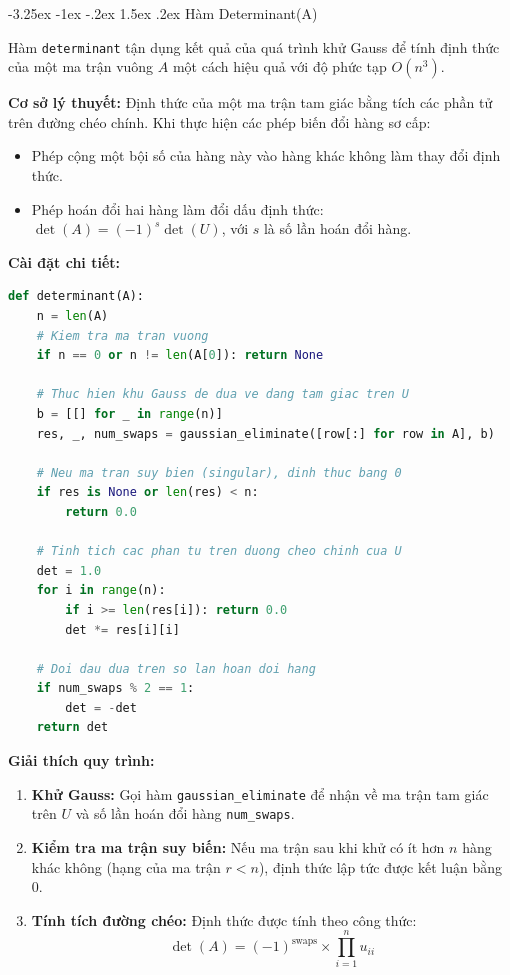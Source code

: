 \documentclass[12pt]{article}
\makeatletter
\newcommand\subsubsubsection{\@startsection{paragraph}{4}{\z@}%
    {-3.25ex \@plus -1ex \@minus -.2ex}%
    {1.5ex \@plus .2ex}%
    {\normalfont\normalsize\bfseries}}
\makeatother
\begin{document}
\subsubsubsection{Hàm Determinant(A)}

Hàm \texttt{determinant} tận dụng kết quả của quá trình khử Gauss để tính định thức của một ma trận vuông $A$ một cách hiệu quả với độ phức tạp $O(n^3)$.

\textbf{Cơ sở lý thuyết:}
Định thức của một ma trận tam giác bằng tích các phần tử trên đường chéo chính. Khi thực hiện các phép biến đổi hàng sơ cấp:
\begin{itemize}
    \item Phép cộng một bội số của hàng này vào hàng khác không làm thay đổi định thức.
    \item Phép hoán đổi hai hàng làm đổi dấu định thức: $\det(A) = (-1)^s \det(U)$, với $s$ là số lần hoán đổi hàng.
\end{itemize}

\textbf{Cài đặt chi tiết:}

\begin{lstlisting}[language=Python]
def determinant(A):
    n = len(A)
    # Kiem tra ma tran vuong
    if n == 0 or n != len(A[0]): return None
    
    # Thuc hien khu Gauss de dua ve dang tam giac tren U
    b = [[] for _ in range(n)]
    res, _, num_swaps = gaussian_eliminate([row[:] for row in A], b)

    # Neu ma tran suy bien (singular), dinh thuc bang 0
    if res is None or len(res) < n:
        return 0.0

    # Tinh tich cac phan tu tren duong cheo chinh cua U
    det = 1.0
    for i in range(n):
        if i >= len(res[i]): return 0.0
        det *= res[i][i]

    # Doi dau dua tren so lan hoan doi hang
    if num_swaps % 2 == 1:
        det = -det
    return det
\end{lstlisting}

\textbf{Giải thích quy trình:}
\begin{enumerate}
    \item \textbf{Khử Gauss:} Gọi hàm \texttt{gaussian\_eliminate} để nhận về ma trận tam giác trên $U$ và số lần hoán đổi hàng \texttt{num\_swaps}.
    \item \textbf{Kiểm tra ma trận suy biến:} Nếu ma trận sau khi khử có ít hơn $n$ hàng khác không (hạng của ma trận $r < n$), định thức lập tức được kết luận bằng $0$.
    \item \textbf{Tính tích đường chéo:} Định thức được tính theo công thức:
    \begin{equation}
    \det(A) = (-1)^{\text{swaps}} \times \prod_{i=1}^{n} u_{ii}
    \end{equation}
\end{enumerate}
\end{document}
